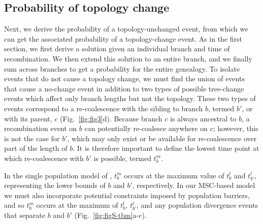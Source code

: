 \documentclass[11pt]{article}
\begin{document}
\subsection{Probability of topology change}
Next, we derive the probability of a topology-unchanged event, from which
we can get the associated probability of a topology-change event. 
As in the first section, we first derive a solution given an individual 
branch and time of recombination. We then extend this solution to an entire branch, and we 
finally sum across branches to get a probability for the entire genealogy. 
To isolate events that do not cause a topology change, we must find
the union of events that cause a no-change event in addition to two types of 
possible tree-change events which affect only branch lengths but not the 
topology. These two types of events correspond to a re-coalescence with the 
sibling to branch $b$, termed $b'$, or with its parent, $c$ (Fig.~\ref{fig:fig3}d).
Because branch $c$ is always ancestral to $b$, a recombination
event on $b$ can potentially re-coalesce anywhere on $c$; however, 
this is not the case for $b'$, which may only exist or be available for 
re-coalescence over part of the length of $b$. It is therefore important 
to define the lowest time point at which re-coalescence with $b'$ is 
possible, termed $t_b^m$. 

In the single population model of \citet{deng_distribution_2021}, 
$t_b^m$ occurs at the maximum value of $t_b^l$ and $t_{b'}^l$, 
representing the lower bounds of $b$ and $b'$, respectively. 
In our MSC-based model we must also incorporate potential 
constraints imposed by population barriers, and so $t_b^m$ occurs at 
the maximum of $t_b^l$, $t_{b'}^l$, and any population divergence 
events that separate $b$ and $b'$ (Fig.~\ref{fig:figS-tbm}a-c).
\end{document}
